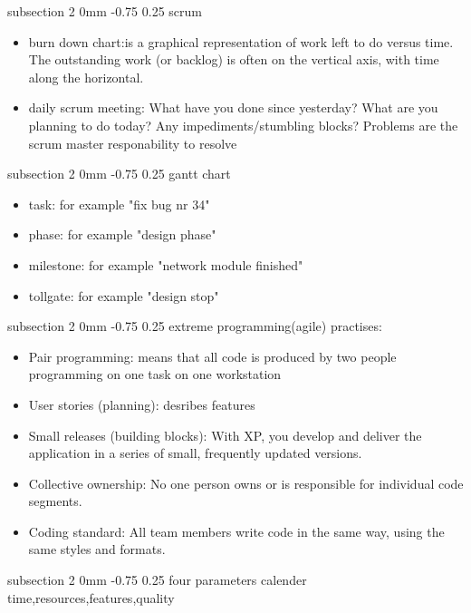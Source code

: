 \documentclass[a4paper,11pt]{article}
\makeatletter
\renewcommand{\subsection}{\@startsection
   {subsection}%
   {2}%
   {0mm}%
   {-0.75\baselineskip}%
   {0.25\baselineskip}%
   {\rmfamily\normalfont\slshape\normalsize}}%
\makeatother
\begin{document}
\subsection{scrum}
\begin{itemize}
\item burn down chart:is a graphical representation of work left to do versus time. The outstanding work (or backlog) is often on the vertical axis, with time along the horizontal.
\item daily scrum meeting:
    What have you done since yesterday?
    What are you planning to do today?
    Any impediments/stumbling blocks? Problems are the scrum master responability to resolve

\end{itemize}
\subsection{gantt chart}
\begin{itemize}
\item task: for example "fix bug nr 34"
\item phase: for example "design phase"
\item milestone: for example "network module finished"
\item tollgate: for example "design stop"
\end{itemize}
\subsection{extreme programming(agile)}
practises:
\begin{itemize}
\item Pair programming: means that all code is produced by two people programming on one task on one workstation
\item User stories (planning): desribes features
\item Small releases (building blocks): With XP, you develop and deliver the application in a series of small, frequently updated versions.
\item Collective ownership: No one person owns or is responsible for individual code segments.
\item Coding standard: All team members write code in the same way, using the same styles and formats.
\end{itemize}
\subsection{four parameters}
calender time,resources,features,quality
\end{document}
